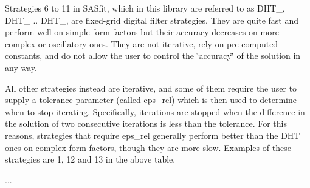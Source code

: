 Strategies 6 to 11 in SASfit, which in this library are referred to as DHT\+\_, DHT\+\_ .. DHT\+\_, are fixed-\/grid digital filter strategies. They are quite fast and perform well on simple form factors but their accuracy decreases on more complex or oscillatory ones. They are not iterative, rely on pre-\/computed constants, and do not allow the user to control the \char`\"{}accuracy\char`\"{} of the solution in any way.

All other strategies instead are iterative, and some of them require the user to supply a tolerance parameter (called {\ttfamily eps\+\_\+rel}) which is then used to determine when to stop iterating. Specifically, iterations are stopped when the difference in the solution of two consecutive iterations is less than the tolerance. For this reasons, strategies that require eps\+\_\+rel generally perform better than the DHT ones on complex form factors, though they are more slow. Examples of these strategies are 1, 12 and 13 in the above table.

... 